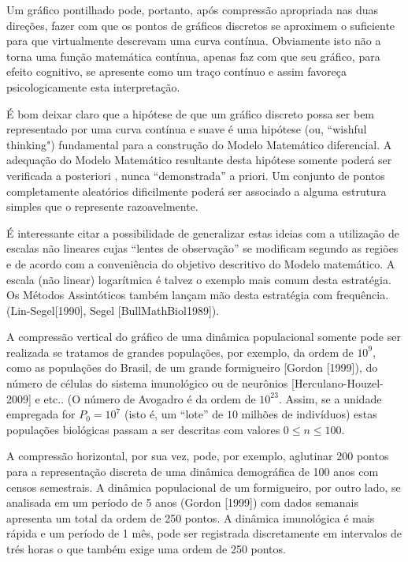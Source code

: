     Um gráfico pontilhado pode, portanto, após compressão apropriada nas duas direções, fazer com que os pontos de gráficos discretos se aproximem o suficiente para que virtualmente descrevam uma curva contínua. Obviamente isto não a torna uma função matemática contínua, apenas faz com que seu gráfico, para efeito cognitivo, se apresente como um traço contínuo e assim favoreça psicologicamente esta interpretação.

    É bom deixar claro que a hipótese de que um gráfico discreto possa ser bem representado por uma curva contínua e suave é uma hipótese (ou, ``wishful thinking") fundamental para a construção do Modelo Matemático diferencial. A adequação do Modelo Matemático resultante desta hipótese somente poderá ser verificada a posteriori , nunca ``demonstrada'' a priori. Um conjunto de pontos completamente aleatórios dificilmente poderá ser associado a alguma estrutura simples que o represente razoavelmente.

    É interessante citar a possibilidade de generalizar estas ideias com a utilização de escalas não lineares cujas ``lentes de observação'' se modificam segundo as regiões e de acordo com a conveniência do objetivo descritivo do Modelo matemático. A escala (não linear) logarítmica é talvez o exemplo mais comum desta estratégia. Os Métodos Assintóticos também lançam mão desta estratégia com frequência. (Lin-Segel[1990], Segel [BullMathBiol1989]).

    A compressão vertical do gráfico de uma dinâmica populacional somente pode ser realizada se tratamos de grandes populações, por exemplo, da ordem de \(10^9\), como as populações do Brasil, de um grande formigueiro [Gordon [1999]), do número de células do sistema imunológico ou de neurônios [Herculano-Houzel-2009] e etc.. (O número de Avogadro é da ordem de \(10^{23}\). Assim, se a unidade empregada for \(P_0 = 10^{7}\) (isto é, um ``lote'' de \(10\) milhões de indivíduos) estas populações biológicas passam a ser descritas com valores \(0 \le n \le 100\).

    A compressão horizontal, por sua vez, pode, por exemplo, aglutinar 200 pontos para a representação discreta de uma dinâmica demográfica de 100 anos com censos semestrais. A dinâmica populacional de um formigueiro, por outro lado, se analisada em um período de 5 anos (Gordon [1999]) com dados semanais apresenta um total da ordem de 250 pontos. A dinâmica imunológica é mais rápida e um período de 1 mês, pode ser registrada discretamente em intervalos de trés horas o que também exige uma ordem de 250 pontos.

